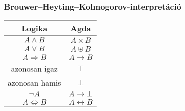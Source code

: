 \documentclass[14pt]{beamer}
\begin{document}
\begin{frame}
  \frametitle{Brouwer–Heyting–Kolmogorov-interpretáció}
  \begin{center}
    \begin{tabular}{| c | c |}
      \hline
      \textbf{Logika} & \textbf{Agda} \\ \hline \hline
      $A \wedge B$ & $A \times B$ \\ \hline
      $A \vee B$ & $A \uplus B$ \\ \hline
      $A \Rightarrow B$ & $A \to B$ \\ \hline
      azonosan igaz & $\top$ \\ \hline
      azonosan hamis & $\bot$ \\ \hline
      $\neg A$ & $A \to \bot$ \\ \hline
      $A \Leftrightarrow B$ & $A \leftrightarrow B$ \\ \hline
    \end{tabular}
  \end{center}
\end{frame}
\end{document}
